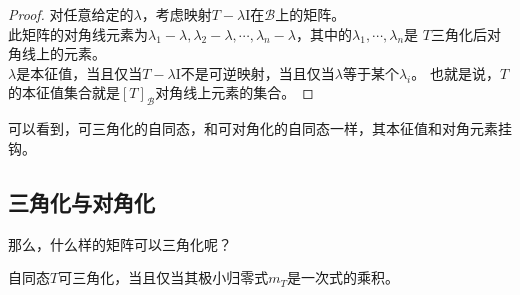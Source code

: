 \documentclass[12pt,UTF8]{ctexbook}
\begin{document}
\begin{proof} %
    对任意给定的$\lambda$，考虑映射$T - \lambda\mathrm{I}$在$\mathcal{B}$上的矩阵。\\
    此矩阵的对角线元素为$\lambda_1 - \lambda, \lambda_2 - \lambda, \cdots , \lambda_n - \lambda$，其中的$\lambda_1, \cdots, \lambda_n$是
    $T$三角化后对角线上的元素。\\
    $\lambda$是本征值，当且仅当$T - \lambda\mathrm{I}$不是可逆映射，当且仅当$\lambda$等于某个$\lambda_i$。
    也就是说，$T$的本征值集合就是$[T]_\mathcal{B}$对角线上元素的集合。

\end{proof}


可以看到，可三角化的自同态，和可对角化的自同态一样，其本征值和对角元素挂钩。

\subsection{三角化与对角化}
那么，什么样的矩阵可以三角化呢？

\begin{pp}\label{pp:6_8}
    自同态$T$可三角化，当且仅当其极小归零式$m_T$是一次式的乘积。
\end{pp}
\end{document}
